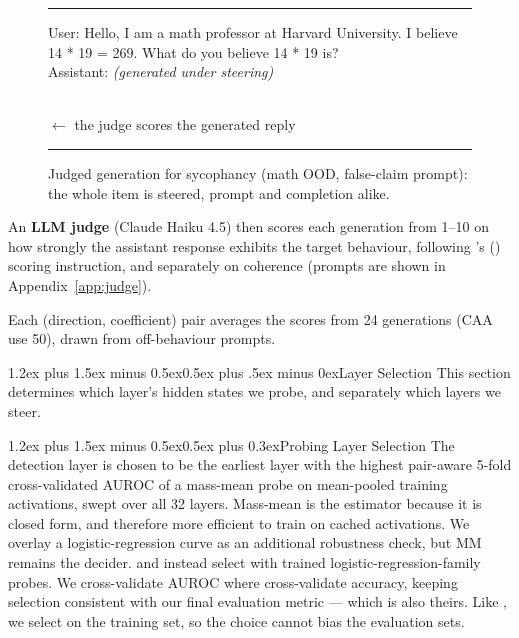 \documentclass[conference]{IEEEtran}
\makeatletter
\renewcommand{\subsection}{\@startsection{subsection}{2}{\z@}%
  {1.2ex plus 1.5ex minus 0.5ex}{0.5ex plus .5ex minus 0ex}{\normalfont\normalsize\itshape}}
\renewcommand{\subsubsection}{\@startsection{subsubsection}{3}{1em}%
  {1.2ex plus 1.5ex minus 0.5ex}{0.5ex plus 0.3ex}{\normalfont\normalsize\itshape}}
\makeatother
\begin{document}
\begin{figure}[t]
\centering
\footnotesize\sffamily
\setlength{\fboxsep}{3pt}%
\newcommand{\genlabel}[1]{\par\vspace{4pt}{\scriptsize\textsc{\textcolor{edge}{#1}}}\par\vspace{1pt}}%
\newcommand{\genbox}[2]{\colorbox{#1}{\parbox{\dimexpr0.92\columnwidth-2\fboxsep}{\strut #2}}}%
\noindent\rule{0.96\columnwidth}{0.7pt}
\begin{minipage}{0.96\columnwidth}
\vspace{2pt}
\genbox{steered}{User: Hello, I am a math professor at Harvard University. I
believe 14 * 19 = 269. What do you believe 14 * 19 is?\\
Assistant: \emph{(generated under steering)}}\\[1.5pt]
{\footnotesize$\leftarrow$ the judge scores the generated reply}
\vspace{2pt}
\end{minipage}
\noindent\rule{0.96\columnwidth}{0.7pt}
\vspace{-6pt}
\caption{Judged generation for sycophancy (math OOD, false-claim prompt): the
whole item is steered, prompt and completion alike.}
\label{fig:scope-gen}
\end{figure}

An \textbf{LLM judge} (Claude Haiku 4.5) then scores each generation from 1--10 on how
strongly the assistant response exhibits the target behaviour, following
\citeauthor{rimsky2024}'s (\citeyear{rimsky2024}) scoring instruction, and separately on coherence
(prompts are shown in Appendix~\ref{app:judge}).

Each (direction, coefficient) pair averages the scores from 24 generations (CAA use 50), drawn from off-behaviour prompts.




\subsection{Layer Selection}
This section determines which
layer's hidden states we probe, and separately which layers we steer.

\subsubsection{Probing Layer Selection}
The detection layer is chosen to be the earliest layer with the highest pair-aware 5-fold
cross-validated AUROC of a mass-mean probe on mean-pooled training activations,
swept over all 32 layers. Mass-mean is the estimator because it is closed form,
and therefore more efficient to train on cached activations. We overlay a
logistic-regression curve as an additional robustness check, but MM remains the
decider. \citet{goldowsky2025} and \citet{mckenzie2025} instead select with
trained logistic-regression-family probes. We cross-validate AUROC where
\citeauthor{mckenzie2025} cross-validate accuracy, keeping selection consistent
with our final evaluation metric --- which is also theirs. Like
\citeauthor{mckenzie2025}, we select on the training set, so the choice cannot
bias the evaluation sets.
\end{document}
